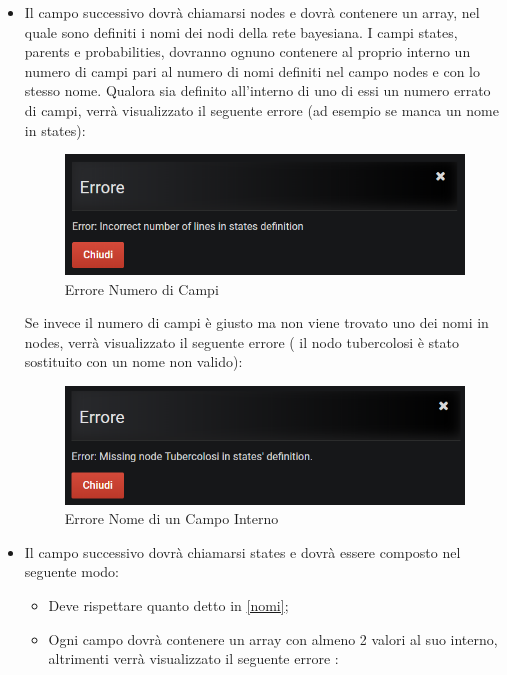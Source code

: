\begin{itemize}
	\item Il campo successivo dovrà chiamarsi nodes e dovrà contenere un array, nel quale sono definiti i nomi dei nodi della rete bayesiana.\label{nomi} I campi states, parents e probabilities, dovranno ognuno contenere al proprio interno un numero di campi pari al numero di nomi definiti nel campo nodes e con lo stesso nome. Qualora sia definito all'interno di uno di essi un numero errato di campi, verrà visualizzato il seguente errore (ad esempio se manca un nome in states): 

\begin{figure}[H]
	\begin{center}
		\includegraphics[scale=0.6]{./images/numberFields.png}
		 \caption{Errore Numero di Campi}	
		 \label{erNumCampi}
	\end{center}
\end{figure}

Se invece il numero di campi è giusto ma non viene trovato uno dei nomi in nodes, verrà visualizzato il seguente errore ( il nodo tubercolosi è stato sostituito con un nome non valido):

\begin{figure}[H]
	\begin{center}
		\includegraphics[scale=0.6]{./images/wrongName.png}
		 \caption{Errore Nome di un Campo Interno}	
		 \label{erNumCampi}
	\end{center}
\end{figure}

	\item Il campo successivo dovrà chiamarsi states e dovrà essere composto nel seguente modo:
	\begin{itemize}
		\item Deve rispettare quanto detto  in \ref{nomi};
		\item Ogni campo dovrà contenere un array con almeno 2 valori al suo interno, altrimenti verrà visualizzato il seguente errore :
		

\end{itemize}
\end{itemize}
